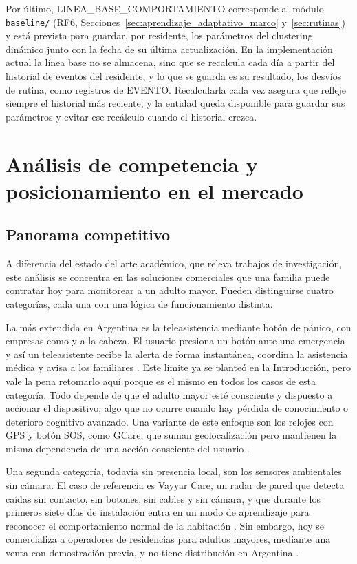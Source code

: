 Por último, LINEA\_BASE\_COMPORTAMIENTO corresponde al módulo \texttt{baseline/} (RF6, Secciones~\ref{sec:aprendizaje_adaptativo_marco} y~\ref{sec:rutinas}) y está prevista para guardar, por residente, los parámetros del clustering dinámico junto con la fecha de su última actualización.
En la implementación actual la línea base no se almacena, sino que se recalcula cada día a partir del historial de eventos del residente, y lo que se guarda es su resultado, los desvíos de rutina, como registros de EVENTO.
Recalcularla cada vez asegura que refleje siempre el historial más reciente, y la entidad queda disponible para guardar sus parámetros y evitar ese recálculo cuando el historial crezca.

\FloatBarrier

\section{Análisis de competencia y posicionamiento en el mercado}
\label{sec:competencia}

\subsection{Panorama competitivo}
\label{sec:panorama_competitivo}

A diferencia del estado del arte académico, que releva trabajos de investigación, este análisis se concentra en las soluciones comerciales que una familia puede contratar hoy para monitorear a un adulto mayor.
Pueden distinguirse cuatro categorías, cada una con una lógica de funcionamiento distinta.

La más extendida en Argentina es la teleasistencia mediante botón de pánico, con empresas como \textcite{SPS} y \textcite{Atempo} a la cabeza.
El usuario presiona un botón ante una emergencia y así un teleasistente recibe la alerta de forma instantánea, coordina la asistencia médica y avisa a los familiares \parencite{SPS}.
Este límite ya se planteó en la Introducción, pero vale la pena retomarlo aquí porque es el mismo en todos los casos de esta categoría.
Todo depende de que el adulto mayor esté consciente y dispuesto a accionar el dispositivo, algo que no ocurre cuando hay pérdida de conocimiento o deterioro cognitivo avanzado.
Una variante de este enfoque son los relojes con GPS y botón SOS, como GCare, que suman geolocalización pero mantienen la misma dependencia de una acción consciente del usuario \parencite{GCare}.

Una segunda categoría, todavía sin presencia local, son los sensores ambientales sin cámara.
El caso de referencia es Vayyar Care, un radar de pared que detecta caídas sin contacto, sin botones, sin cables y sin cámara, y que durante los primeros siete días de instalación entra en un modo de aprendizaje para reconocer el comportamiento normal de la habitación \parencite{Vayyar}.
Sin embargo, hoy se comercializa a operadores de residencias para adultos mayores, mediante una venta con demostración previa, y no tiene distribución en Argentina \parencite{Vayyar}.

